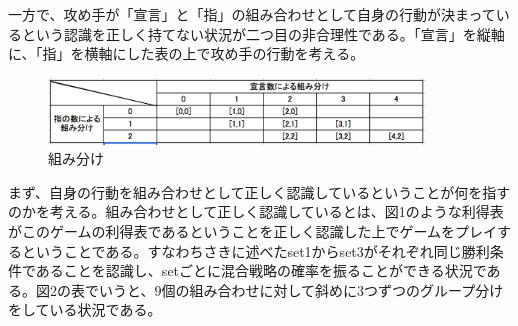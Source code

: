 \documentclass{jsarticle}
\begin{document}
一方で、攻め手が「宣言」と「指」の組み合わせとして自身の行動が決まっているという認識を正しく持てない状況が二つ目の非合理性である。「宣言」を縦軸に、「指」を横軸にした表の上で攻め手の行動を考える。
\begin{figure}[h]
    \centering
    \includegraphics[width=10cm]{class2.png}
    \caption{組み分け}
\end{figure}
まず、自身の行動を組み合わせとして正しく認識しているということが何を指すのかを考える。組み合わせとして正しく認識しているとは、図1のような利得表がこのゲームの利得表であるということを正しく認識した上でゲームをプレイするということである。すなわちさきに述べたset1からset3がそれぞれ同じ勝利条件であることを認識し、setごとに混合戦略の確率を振ることができる状況である。図2の表でいうと、$9$個の組み合わせに対して斜めに3つずつのグループ分けをしている状況である。
\end{document}
